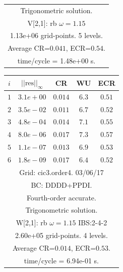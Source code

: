 \begin{table}[hbt]
\begin{center}
{\begin{tabular}{|c|c|c|c|c|}
\multicolumn{5}{|c|}{Trigonometric solution.}  \\
\multicolumn{5}{|c|}{V[2,1]: rb $\omega=1.15$}  \\
\multicolumn{5}{|c|}{1.13e+06 grid-points. 5 levels.}  \\
\multicolumn{5}{|c|}{Average CR=$0.041$, ECR=$0.54$.}  \\
\multicolumn{5}{|c|}{time/cycle = 1.48e+00 s.}  \\
\hline 
\end{tabular}
\begin{tabular}{|c|c|c|c|c|} \hline 
 $i$   & $\vert\vert\mbox{res}\vert\vert_\infty$  &  CR     &  WU    & ECR  \\   \hline 
 $ 1$  & $ 3.1e+00$ & $0.014$ & $ 6.3$ & $0.51$ \\ 
 $ 2$  & $ 3.5e-02$ & $0.011$ & $ 6.7$ & $0.52$ \\ 
 $ 3$  & $ 4.8e-04$ & $0.014$ & $ 7.1$ & $0.55$ \\ 
 $ 4$  & $ 8.0e-06$ & $0.017$ & $ 7.3$ & $0.57$ \\ 
 $ 5$  & $ 1.1e-07$ & $0.013$ & $ 6.9$ & $0.53$ \\ 
 $ 6$  & $ 1.8e-09$ & $0.017$ & $ 6.4$ & $0.52$ \\ 
\hline 
\multicolumn{5}{|c|}{Grid: cic3.order4. 03/06/17}  \\
\multicolumn{5}{|c|}{BC: DDDD+PPDI.}  \\
\multicolumn{5}{|c|}{Fourth-order accurate.}  \\
\multicolumn{5}{|c|}{Trigonometric solution.}  \\
\multicolumn{5}{|c|}{W[2,1]: rb $\omega=1.15$ IBS:2-4-2}  \\
\multicolumn{5}{|c|}{2.60e+05 grid-points. 4 levels.}  \\
\multicolumn{5}{|c|}{Average CR=$0.014$, ECR=$0.53$.}  \\
\multicolumn{5}{|c|}{time/cycle = 6.94e-01 s.}  \\
\hline 
\end{tabular}
}
\end{center}
\end{table}
